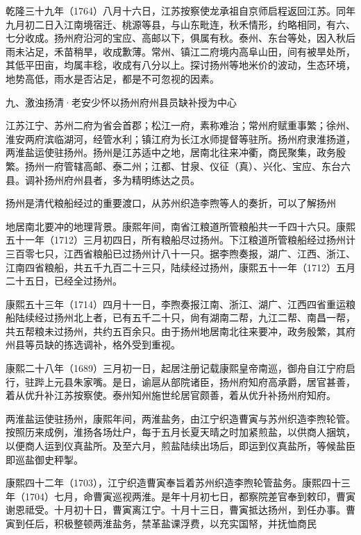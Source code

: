 乾隆三十九年（1764）八月十六日，江苏按察使龙承祖自京师启程返回江苏。同年九月初二日入江南境宿迁、桃源等县，与山东毗连，秋禾情形，约略相同，有六、七分收成。扬州府沿河的宝应、高邮以下，俱属有秋。泰州、东台等处，因入秋后雨未沾足，禾苗稍旱，收成歉薄。常州、镇江二府境内高阜山田，间有被旱处所，其低平田亩，均属丰稔，收成有八分以上。探讨扬州等地米价的波动，生态环境，地势高低，雨水是否沾足，都是不可忽视的因素。

九、激浊扬清·老安少怀以扬州府州县员缺补授为中心

江苏江宁、苏州二府为省会首郡；松江一府，素称难治；常州府赋重事繁；徐州、淮安两府滨临湖河，经管水利；镇江府为长江水师提督等驻所。扬州府隶淮扬道，两淮盐运使驻扬州。扬州是江苏适中之地，居南北往来冲衢，商民聚集，政务殷繁。扬州一府管辖高邮、泰二州；江都、甘泉、仪征（真）、兴化、宝应、东台六县。调补扬州府州县者，多为精明练达之员。

扬州是清代粮船经过的重要渡口，从苏州织造李煦等人的奏折，可以了解扬州

\vfill
\begin{BookNotes}
\end{BookNotes}

\noindent 地居南北要冲的地理背景。康熙年间，南省江粮道所管粮船共一千四十六只。康熙五十一年（1712）三月初四日，所有粮船尽过扬州。下江粮道所管粮船经过扬州计三百零七只，江西省粮船已过扬州计八十一只。据李煦奏报，湖广、江西、浙江、江南四省粮船，共五千九百二十三只，陆续经过扬州，康熙五十一年（1712）五月二十五日，已经全过扬州。

康熙五十三年（1714）四月十一日，李煦奏报江南、浙江、湖广、江西四省重运粮船陆续经过扬州北上者，已有五千二十只，尙有湖南二帮，九江二帮、南昌一帮，共五帮粮未过扬州，共约五百余只。由于扬州地居南北往来要冲，政务殷繁，其府州县等员缺的拣选调补，格外受到重视。

康熙二十八年（1689）三月初一日，起居注册记载康熙皇帝南巡，御舟自江宁府启行，驻跸上元县朱家嘴。是日，谕扈从部院诸臣，扬州府知府高承爵，居官甚善，着从优升补江苏按察使。泰州知州施世纶居官颇善，着从优升补扬州府知府。

两淮盐运使驻扬州，康熙年间，两淮盐务，由江宁织造曹寅与苏州织造李煦轮管。按照历来成例，淮扬各场灶户，每于五月长夏天晴之时加紧煎盐，以供商人捆筑，以便商人运到仪真盐所。及至六月，煎盐陆续出场后，即运到仪真盐所，等候盐臣即巡盐御史秤掣。

康熙四十二年（1703），江宁织造曹寅奉旨着苏州织造李煦轮管盐务。康熙四十三年（1704）七月，命曹寅巡视两淮。是年十月初七日，都察院差官奉到敕印，曹寅谢恩祗受。十月初十日，曹寅离江宁。十月十三日，曹寅抵达扬州，到任办事。曹寅到任后，积极整顿两淮盐务，禁革盐课浮费，以充实国帑，并抚恤商民

